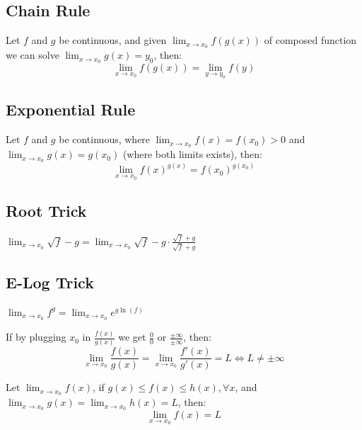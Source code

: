 \documentclass[8pt,a4paper]{extarticle}     %
\theoremstyle{definition}
\theoremstyle{definition}
\theoremstyle{definition}
\begin{document}
\begin{multicols}{4}
\subsection{Chain Rule}
Let $f$ and $g$ be continuous, and given $\lim_{x \to x_0}f(g(x))$ of composed function we can solve $\lim_{x \to x_0}g(x) = y_0$, then: \\ 
$$\lim_{x \to x_0}f(g(x)) = \lim_{y \to y_0}f(y)$$
\subsection{Exponential Rule} 
Let $f$ and $g$ be continuous, where $\lim_{x\to x_0}f(x) = f(x_0) > 0$ and $\lim_{x\to x_0}g(x) = g(x_0)$ (where both limits exists), then:
$$\lim_{x \to x_0}f(x)^{g(x)} = f(x_0)^{g(x_0)}$$
\subsection{Root Trick}
$\displaystyle\lim_{x \to x_0} \sqrt{f}-g = \lim_{x \to x_0} \sqrt{f}- g \cdot \frac{\sqrt{f}+g}{\sqrt{f}+g}$
\subsection{E-Log Trick}
$\displaystyle\lim_{x \to x_0}f^g = \lim_{x \to x_0}e^{g\ln(f)}$
\begin{boxtheorem}
	If by plugging $x_0$ in $\frac{f(x)}{g(x)}$ we get $\frac{0}{0}$ or $\frac{\pm\infty}{\pm\infty}$, then: \\
	$$\displaystyle\lim_{x \to x_0}\frac{f(x)}{g(x)} = \lim_{x \to x_0}\frac{f'(x)}{g'(x)} = L \Leftrightarrow L \neq \pm\infty$$
\end{boxtheorem}
\begin{boxtheorem}
Let $\displaystyle\lim_{x \to x_0}f(x)$, if $g(x) \leq f(x) \leq h(x), \forall x$, and $\displaystyle\lim_{x \to x_0}g(x) = \lim_{x \to x_0}h(x) = L$, then: \\$$\displaystyle\lim_{x \to x_0}f(x) = L$$
\end{boxtheorem}

\end{multicols}
\end{document}

